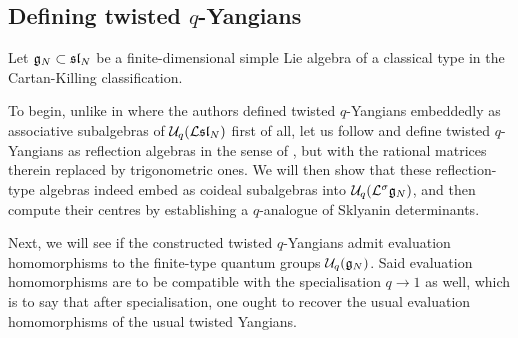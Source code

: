     \subsection{\texorpdfstring{Defining twisted $q$-Yangians}{}}
        Let $\mathfrak{g}_N \subset \mathfrak{sl}_N$ be a finite-dimensional simple Lie algebra of a classical type in the Cartan-Killing classification.
    
        To begin, unlike in \cite{molev_ragoucy_sorba_twisted_q_yangians_type_A} where the authors defined twisted $q$-Yangians embeddedly as associative subalgebras of $\mathcal{U}_q(\mathcal{L}\mathfrak{sl}_N)$ first of all, let us follow \cite{regelskis_vlaar_reflection_matrices_coideal_subalgebras} and define twisted $q$-Yangians as reflection algebras in the sense of \cite{guay_regelskis_twisted_yangians_for_symmetric_pairs_of_types_BCD}, but with the rational matrices therein replaced by trigonometric ones. We will then show that these reflection-type algebras indeed embed as coideal subalgebras into $\mathcal{U}_q(\mathcal{L}^{\sigma}\mathfrak{g}_N)$, and then compute their centres by establishing a $q$-analogue of Sklyanin determinants.

        Next, we will see if the constructed twisted $q$-Yangians admit evaluation homomorphisms to the finite-type quantum groups $\mathcal{U}_q(\mathfrak{g}_N)$. Said evaluation homomorphisms are to be compatible with the specialisation $q \to 1$ as well, which is to say that after specialisation, one ought to recover the usual evaluation homomorphisms of the usual twisted Yangians.